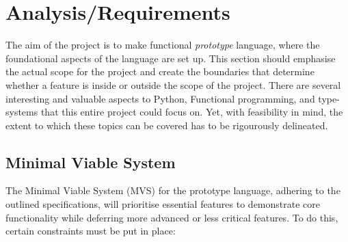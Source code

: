 \documentclass{l4proj}
\begin{document}
\chapter{Analysis/Requirements}
\label{chp:analysis-requirements}



The aim of the project is to make functional \emph{prototype} language, where the foundational aspects of the language are set up.
This section should emphasise the actual scope for the project and create the boundaries that determine whether a feature is inside or outside the scope of the project.
There are several interesting and valuable aspects to Python, Functional programming, and type-systems that this entire project could focus on.
Yet, with feasibility in mind, the extent to which these topics can be covered has to be rigourously delineated.

\section{Minimal Viable System}

The Minimal Viable System (MVS) for the prototype language, adhering to the outlined specifications, will prioritise essential features to demonstrate core functionality while deferring more advanced or less critical features.
To do this, certain constraints must be put in place:
\end{document}

